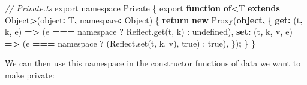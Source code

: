 \documentclass[
]{book}
\newenvironment{Shaded}{\begin{snugshade}}{\end{snugshade}}
\newcommand{\BuiltInTok}[1]{#1}
\newcommand{\CommentTok}[1]{\textcolor[rgb]{0.56,0.35,0.01}{\textit{#1}}}
\newcommand{\ControlFlowTok}[1]{\textcolor[rgb]{0.13,0.29,0.53}{\textbf{#1}}}
\newcommand{\DataTypeTok}[1]{\textcolor[rgb]{0.13,0.29,0.53}{#1}}
\newcommand{\ImportTok}[1]{#1}
\newcommand{\KeywordTok}[1]{\textcolor[rgb]{0.13,0.29,0.53}{\textbf{#1}}}
\newcommand{\NormalTok}[1]{#1}
\newcommand{\OperatorTok}[1]{\textcolor[rgb]{0.81,0.36,0.00}{\textbf{#1}}}
\theoremstyle{definition}
\theoremstyle{definition}
\theoremstyle{definition}
\theoremstyle{definition}
\theoremstyle{remark}
\begin{document}
\begin{Shaded}
\begin{Highlighting}[]
\CommentTok{// Private.ts}
\ImportTok{export} \ImportTok{namespace} \DataTypeTok{Private}\NormalTok{ \{}
  \ImportTok{export} \KeywordTok{function} \KeywordTok{of}\OperatorTok{\textless{}}\NormalTok{T }\KeywordTok{extends} \BuiltInTok{Object}\OperatorTok{\textgreater{}}\NormalTok{(object}\OperatorTok{:}\NormalTok{ T}\OperatorTok{,}\NormalTok{ namespace}\OperatorTok{:} \BuiltInTok{Object}\NormalTok{) \{}
    \ControlFlowTok{return} \KeywordTok{new} \BuiltInTok{Proxy}\NormalTok{(}\KeywordTok{object}\OperatorTok{,}\NormalTok{ \{}
      \KeywordTok{get}\OperatorTok{:}\NormalTok{ (t}\OperatorTok{,}\NormalTok{ k}\OperatorTok{,}\NormalTok{ e) }\KeywordTok{=\textgreater{}}\NormalTok{ (e }\OperatorTok{===} \ImportTok{namespace}\NormalTok{ ? }\DataTypeTok{Reflect}\NormalTok{.}\DataTypeTok{get}\NormalTok{(}\DataTypeTok{t}\NormalTok{, }\DataTypeTok{k}\NormalTok{) : }\DataTypeTok{undefined}\NormalTok{),}
      \KeywordTok{set}\OperatorTok{:}\NormalTok{ (t}\OperatorTok{,}\NormalTok{ k}\OperatorTok{,}\NormalTok{ v}\OperatorTok{,}\NormalTok{ e) }\KeywordTok{=\textgreater{}}\NormalTok{ (e }\OperatorTok{===} \ImportTok{namespace}\NormalTok{ ? (}\DataTypeTok{Reflect}\NormalTok{.}\DataTypeTok{set}\NormalTok{(}\DataTypeTok{t}\NormalTok{, }\DataTypeTok{k}\NormalTok{, }\DataTypeTok{v}\NormalTok{), }\DataTypeTok{true}\NormalTok{) : }\DataTypeTok{true}\NormalTok{),}
\NormalTok{    \})}\OperatorTok{;}
\NormalTok{  \}}
\NormalTok{\}}
\end{Highlighting}
\end{Shaded}

We can then use this namespace in the constructor functions of data we want to make private:
\end{document}
